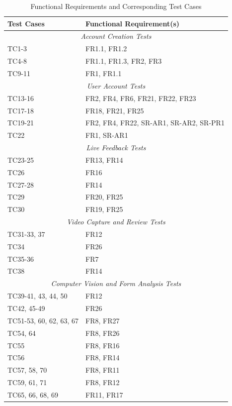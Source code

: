 \documentclass[12pt, titlepage]{article}
\begin{document}
\begin{longtable}{p{}p{}}
  \caption{Functional Requirements and Corresponding Test Cases}
  \label{tab:functional_requirements_trace} \\
  \toprule \textbf{Test Cases} & \textbf{Functional Requirement(s)} \\
  \midrule
  \multicolumn{2}{c}{\textit{Account Creation Tests}} \\
  \midrule
  TC1-3 & FR1.1, FR1.2 \\
  TC4-8 & FR1.1, FR1.3, FR2, FR3 \\
  TC9-11 & FR1, FR1.1 \\
  \midrule
  \multicolumn{2}{c}{\textit{User Account Tests}} \\
  \midrule
  TC13-16 & FR2, FR4, FR6, FR21, FR22, FR23 \\
  TC17-18 & FR18, FR21, FR25 \\
  TC19-21 & FR2, FR4, FR22, SR-AR1, SR-AR2, SR-PR1 \\
  TC22 & FR1, SR-AR1 \\
  \midrule
  \multicolumn{2}{c}{\textit{Live Feedback Tests}} \\
  \midrule
  TC23-25 & FR13, FR14 \\
  TC26 & FR16 \\
  TC27-28 & FR14 \\
  TC29 & FR20, FR25 \\
  TC30 & FR19, FR25 \\
  \midrule
  \multicolumn{2}{c}{\textit{Video Capture and Review Tests}} \\
  \midrule
  TC31-33, 37 & FR12 \\
  TC34 & FR26 \\
  TC35-36 & FR7 \\
  TC38 & FR14 \\
  \midrule
  \multicolumn{2}{c}{\textit{Computer Vision and Form Analysis Tests}} \\
  \midrule
  TC39-41, 43, 44, 50 & FR12 \\
  TC42, 45-49 & FR26 \\
  TC51-53, 60, 62, 63, 67 & FR8, FR27 \\
  TC54, 64 & FR8, FR26 \\
  TC55 & FR8, FR16 \\
  TC56 & FR8, FR14 \\
  TC57, 58, 70 & FR8, FR11 \\
  TC59, 61, 71 & FR8, FR12 \\
  TC65, 66, 68, 69 & FR11, FR17 \\

\end{longtable}
\end{document}
